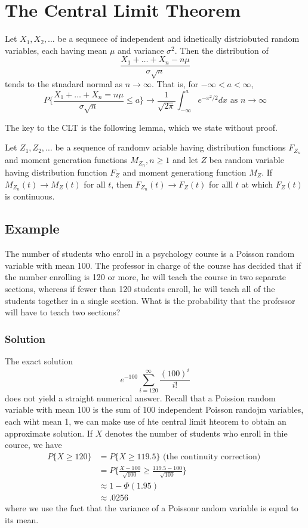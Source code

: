\section{The Central Limit Theorem}
\begin{theorem}
    Let $X_1, X_2,\dots$ be a sequnece of independent and idnetically distriobuted random variables, each having mean $\mu$ and variance $\sigma^2$. Then the distribution of \[\frac{X_1 + \dots + X_n - n\mu}{\sigma\sqrt{n}}\] tends to the stnadard normal as $n\rightarrow\infty$. That is, for $-\infty < a < \infty$, \[P\{\frac{X_1 + \dots + X_n = n\mu}{\sigma\sqrt{n}}\leq a\}\rightarrow \frac{1}{\sqrt{2\pi}}\int^a_{-\infty} e^{-x^2/2} dx \text{ as } n\rightarrow\infty\]
\end{theorem}
The key to the CLT is the following lemma, which we state without proof. 
\begin{lemma}
Let $Z_1, Z_2, \dots$ be a sequence of randomv ariable having distribution functions $F_{Z_n}$ and moment generation functions $M_{Z_n}, n\geq 1$ and let $Z$ bea  random variable having distribution function $F_Z$ and moment generationg function $M_Z$. If $M_{Z_n}(t)\rightarrow M_Z(t)$ for all $t$, then $F_{Z_n}(t)\rightarrow F_{Z}(t)$ for alll $t$ at which $F_Z(t)$ is continuous. 
\end{lemma}
\subsection*{Example}
The number of students who enroll in a psychology course is a Poisson random variable with mean 100. The professor in charge of the course has decided that if the number enrolling is 120 or more, he will teach the course in two separate sections, whereas if fewer than 120 students enroll, he will teach all of the students together in a single section. What is the probability that the professor will have to teach two sections?
\subsubsection*{Solution}
The exact solution \[e^{-100} \sum^\infty_{i = 120} \frac{(100)^i}{i!}\] does not yield a straight numerical answer. Recall that a Poission random variable with mean 100 is the sum of 100 independent Poisson randojm variables, each wiht mean 1, we can make use of hte central limit hteorem to obtain an approximate solution. If $X$ denotes the number of students who enroll in thie cource, we have 
\begin{equation*}
    \begin{split}
        P\{X\geq 120\} &= P\{X\geq 119.5\} \text{ (the continuity correction) }\\
        &= P\{\frac{X - 100}{\sqrt{100}}\geq \frac{119.5-100}{\sqrt{100}}\}\\
        &\approx 1 - \Phi(1.95)\\
        &\approx .0256
    \end{split}
\end{equation*}
where we use the fact that the variance of a Poissonr andom variable is equal to its mean. 
